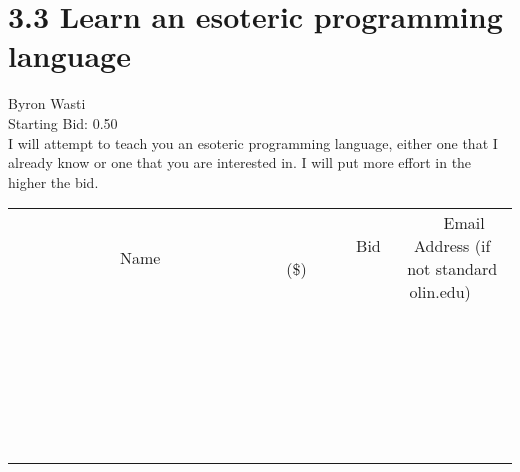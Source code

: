 \documentclass[11pt]{article}
\begin{document}
					\section*{3.3 Learn an esoteric programming language}
					Byron Wasti \\
					Starting Bid: 0.50 \\
					I will attempt to teach you an esoteric programming language, either one that I already know or one that you are interested in. I will put more effort in the higher the bid. \\
					[6ex]
					\begin{tabular}{c c c}
						~~~~~~~~~~~~~Name~~~~~~~~~~~~~ & ~~~~~~~~~Bid (\$)~~~~~~~~~ & ~~~Email Address (if not standard olin.edu)~~~ \\
				
 & & \\
\hline
 & & \\
\hline
 & & \\
\hline
 & & \\
\hline
 & & \\
\hline
 & & \\
\hline
 & & \\
\hline
 & & \\
\hline
 & & \\
\hline
 & & \\
\hline
 & & \\
\hline
 & & \\
\hline
 & & \\
\hline
 & & \\
\hline
 & & \\
\hline
 & & \\
\hline
 & & \\
\hline
 & & \\
\hline
 & & \\
\hline
 & & \\
\hline
 & & \\
\hline
 & & \\
\hline
 & & \\
\hline
 & & \\
\hline
 & & \\
\hline
 & & \\
\hline
					\end{tabular}
					\clearpage
				
\end{document}
